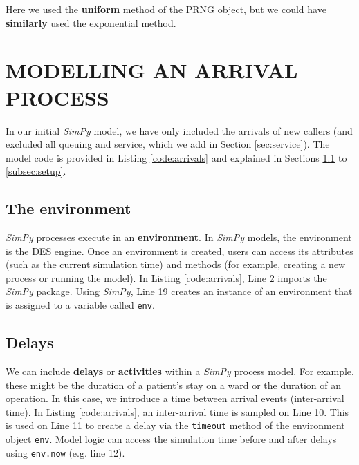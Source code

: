 \documentclass{swpaperproc}
\theoremstyle{sw}
\begin{document}
Here we used the \textbf{uniform} method of the PRNG object, but we could have \textbf{similarly} used the exponential method.




\section{MODELLING AN ARRIVAL PROCESS}
\label{sec:arrivals}

In our initial \textit{SimPy} model, we have only included the arrivals of new callers (and excluded all queuing and service, which we add in Section \ref{sec:service}). The model code is provided in Listing \ref{code:arrivals} and explained in Sections \ref{subsec:env} to \ref{subsec:setup}.




\subsection{The environment}
\label{subsec:env}

\textit{SimPy} processes execute in an \textbf{environment}.  In \textit{SimPy} models, the environment is the DES engine. Once an environment is created, users can access its attributes (such as the current simulation time) and methods (for example, creating a new process or running the model). In Listing \ref{code:arrivals}, Line 2 imports the \textit{SimPy} package. Using \textit{SimPy}, Line 19 creates an instance of an environment that is assigned to a variable called \verb|env|.


\subsection{Delays}

We can include \textbf{delays} or \textbf{activities} within a \textit{SimPy} process model.  For example, these might be the duration of a patient's stay on a ward or the duration of an operation.  In this case, we introduce a time between arrival events (inter-arrival time).  In Listing \ref{code:arrivals}, an inter-arrival time is sampled on Line 10. This is used on Line 11 to create a delay via the \verb|timeout| method of the environment object \verb|env|.  Model logic can access the simulation time before and after delays using \verb|env.now| (e.g. line 12).
\end{document}
